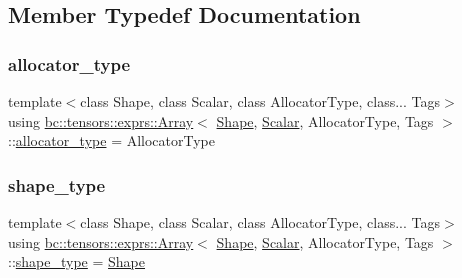 \subsection{Member Typedef Documentation}
\mbox{\label{structbc_1_1tensors_1_1exprs_1_1Array_a990afcebe8817075d427f2653d197140}} 
\subsubsection{\texorpdfstring{allocator\+\_\+type}{allocator\_type}}
{\footnotesize\ttfamily template$<$class Shape, class Scalar, class Allocator\+Type, class... Tags$>$ \\
using \hyperlink{structbc_1_1tensors_1_1exprs_1_1Array}{bc\+::tensors\+::exprs\+::\+Array}$<$ \hyperlink{structbc_1_1Shape}{Shape}, \hyperlink{namespacebc_aa12ac55ee2c43dc082894dd3859daee1}{Scalar}, Allocator\+Type, Tags $>$\+::\hyperlink{structbc_1_1tensors_1_1exprs_1_1Array_a990afcebe8817075d427f2653d197140}{allocator\+\_\+type} =  Allocator\+Type}

\mbox{\label{structbc_1_1tensors_1_1exprs_1_1Array_a67c96ea64a2899ba0593a6b81aa0868e}} 
\subsubsection{\texorpdfstring{shape\+\_\+type}{shape\_type}}
{\footnotesize\ttfamily template$<$class Shape, class Scalar, class Allocator\+Type, class... Tags$>$ \\
using \hyperlink{structbc_1_1tensors_1_1exprs_1_1Array}{bc\+::tensors\+::exprs\+::\+Array}$<$ \hyperlink{structbc_1_1Shape}{Shape}, \hyperlink{namespacebc_aa12ac55ee2c43dc082894dd3859daee1}{Scalar}, Allocator\+Type, Tags $>$\+::\hyperlink{structbc_1_1tensors_1_1exprs_1_1Array_a67c96ea64a2899ba0593a6b81aa0868e}{shape\+\_\+type} =  \hyperlink{structbc_1_1Shape}{Shape}}

\mbox{\label{structbc_1_1tensors_1_1exprs_1_1Array_aba97273ba94fb140763e7db5da630ea0}} 
